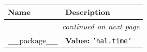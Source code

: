     \vspace{-1cm}
\hspace{\varindent}\begin{longtable}{|p{\varnamewidth}|p{\vardescrwidth}|l}
\cline{1-2}
\cline{1-2} \centering \textbf{Name} & \centering \textbf{Description}& \\
\cline{1-2}
\endhead\cline{1-2}\multicolumn{3}{r}{\small\textit{continued on next page}}\\\endfoot\cline{1-2}
\endlastfoot\raggedright \_\-\_\-p\-a\-c\-k\-a\-g\-e\-\_\-\_\- & \raggedright \textbf{Value:} 
{\tt \texttt{'}\texttt{hal.time}\texttt{'}}&\\
\cline{1-2}
\end{longtable}

